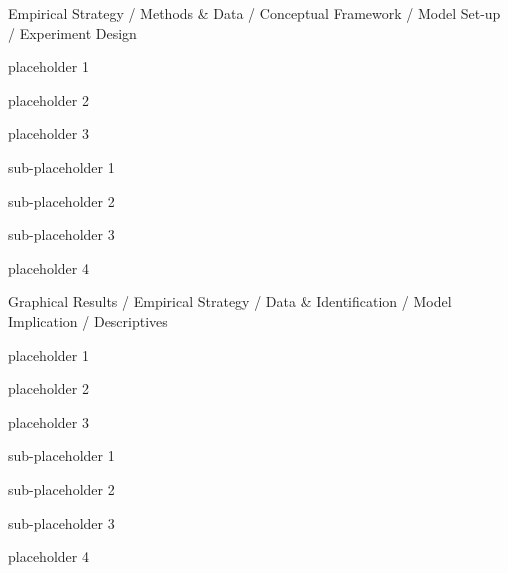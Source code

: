 \begin{frame}{Empirical Strategy / Methods \& Data / Conceptual Framework / Model Set-up / Experiment Design}
  \begin{wideitemize}
    \item placeholder 1
    \item placeholder 2
    \item placeholder 3
      
      \begin{wideitemize}
    		\item sub-placeholder 1
    		\item sub-placeholder 2
    		\item sub-placeholder 3
  	  \end{wideitemize}
  	
  	\item placeholder 4
  \end{wideitemize}
\end{frame}
\begin{frame}{Graphical Results / Empirical Strategy / Data \& Identification / Model Implication / Descriptives}
  \begin{wideitemize}
    \item placeholder 1
    \item placeholder 2
    \item placeholder 3
      
      \begin{wideitemize}
    		\item sub-placeholder 1
    		\item sub-placeholder 2
    		\item sub-placeholder 3
  	  \end{wideitemize}
  	
  	\item placeholder 4
  \end{wideitemize}
\end{frame}
